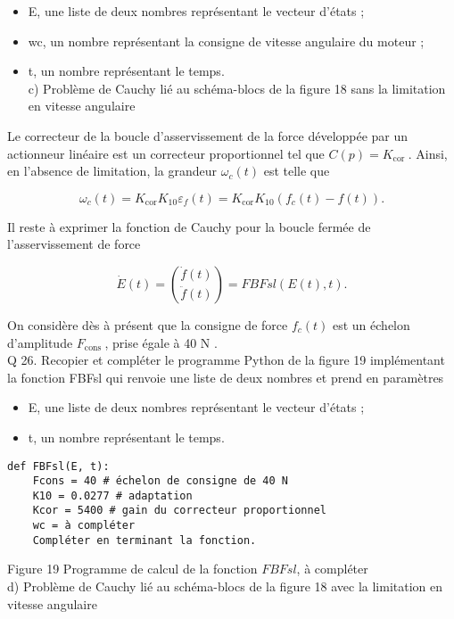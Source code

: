 \begin{itemize}
  \item E, une liste de deux nombres représentant le vecteur d'états ;
  \item wc, un nombre représentant la consigne de vitesse angulaire du moteur ;
  \item t, un nombre représentant le temps.\\
c) Problème de Cauchy lié au schéma-blocs de la figure 18 sans la limitation en vitesse angulaire
\end{itemize}

Le correcteur de la boucle d'asservissement de la force développée par un actionneur linéaire est un correcteur proportionnel tel que $C(p)=K_{\text {cor }}$. Ainsi, en l'absence de limitation, la grandeur $\omega_{c}(t)$ est telle que

$$
\omega_{c}(t)=K_{\operatorname{cor}} K_{10} \varepsilon_{f}(t)=K_{\operatorname{cor}} K_{10}\left(f_{c}(t)-f(t)\right) .
$$

Il reste à exprimer la fonction de Cauchy pour la boucle fermée de l'asservissement de force

$$
\dot{E}(t)=\binom{\dot{f}(t)}{\ddot{f}(t)}=F B F s l(E(t), t) .
$$

On considère dès à présent que la consigne de force $f_{c}(t)$ est un échelon d'amplitude $F_{\text {cons }}$, prise égale à 40 N .\\
Q 26. Recopier et compléter le programme Python de la figure 19 implémentant la fonction FBFsl qui renvoie une liste de deux nombres et prend en paramètres

\begin{itemize}
  \item E, une liste de deux nombres représentant le vecteur d'états ;
  \item t, un nombre représentant le temps.
\end{itemize}

\begin{verbatim}
def FBFsl(E, t):
    Fcons = 40 # échelon de consigne de 40 N
    K10 = 0.0277 # adaptation
    Kcor = 5400 # gain du correcteur proportionnel
    wc = à compléter
    Compléter en terminant la fonction.
\end{verbatim}

Figure 19 Programme de calcul de la fonction $F B F s l$, à compléter\\
d) Problème de Cauchy lié au schéma-blocs de la figure 18 avec la limitation en vitesse angulaire

